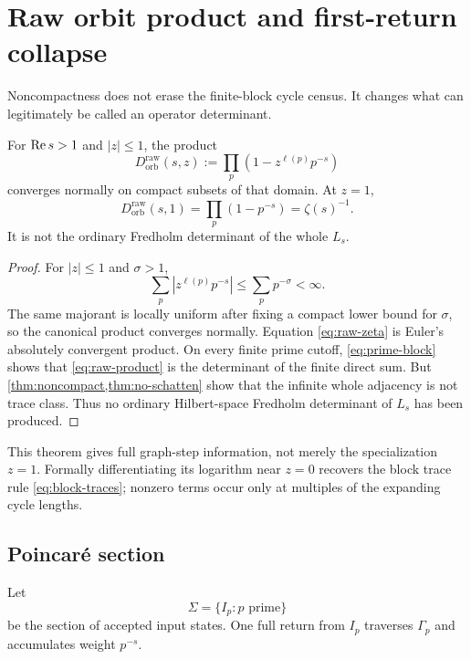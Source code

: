 \section{Raw orbit product and first-return collapse}
\label{sec:return}

Noncompactness does not erase the finite-block cycle census.  It changes what
can legitimately be called an operator determinant.

\begin{theorem}
\label{thm:raw-product}
For $\operatorname{Re} s>1$ and $|z|\le1$, the product
\begin{equation}
D_{\mathrm{orb}}^{\mathrm{raw}}(s,z)
:=\prod_p\left(1-z^{\ell(p)}p^{-s}\right)
\label{eq:raw-product}
\end{equation}
converges normally on compact subsets of that domain.  At $z=1$,
\begin{equation}
D_{\mathrm{orb}}^{\mathrm{raw}}(s,1)
=\prod_p(1-p^{-s})=\zeta(s)^{-1}.
\label{eq:raw-zeta}
\end{equation}
It is not the ordinary Fredholm determinant of the whole $L_s$.
\end{theorem}

\begin{proof}
For $|z|\le1$ and $\sigma>1$,
\[
\sum_p\left|z^{\ell(p)}p^{-s}\right|
\le\sum_pp^{-\sigma}<\infty.
\]
The same majorant is locally uniform after fixing a compact lower bound for
$\sigma$, so the canonical product converges normally.  Equation
\eqref{eq:raw-zeta} is Euler's absolutely convergent product.  On every
finite prime cutoff,
\eqref{eq:prime-block} shows that
\eqref{eq:raw-product} is the determinant of the finite direct sum.  But
\cref{thm:noncompact,thm:no-schatten} show that the infinite whole adjacency
is not trace class.  Thus no ordinary Hilbert-space Fredholm determinant of
$L_s$ has been produced.
\end{proof}

This theorem gives full graph-step information, not merely the specialization
$z=1$.  Formally differentiating its logarithm near $z=0$ recovers the block
trace rule
\eqref{eq:block-traces}; nonzero terms occur only at multiples of the
expanding cycle lengths.

\subsection{Poincar\'e section}

Let
\[
\Sigma=\{I_p:p\text{ prime}\}
\]
be the section of accepted input states.  One full return from $I_p$ traverses
$\Gamma_p$ and accumulates weight $p^{-s}$.

